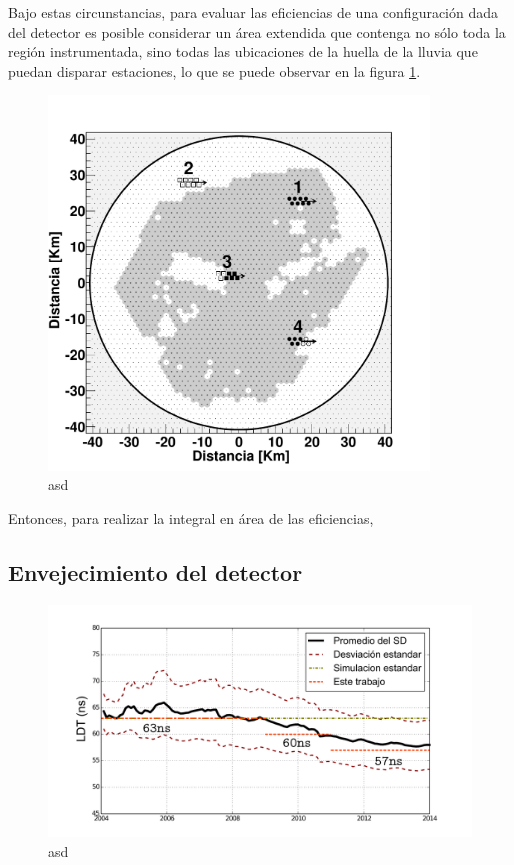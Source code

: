 	Bajo estas circunstancias, para evaluar las eficiencias de una configuración dada del detector es posible considerar un área extendida que contenga no sólo toda la región instrumentada, sino todas las ubicaciones de la huella de la lluvia que puedan disparar estaciones, lo que se puede observar en la figura \ref{fig:areaExtendida}.
	\begin{figure}[h!]
		\begin{center}
			\includegraphics[width=0.9\textwidth]{fig/resultadosAuger/aperturaReal}
			\caption{asd}
			\label{fig:areaExtendida}
		\end{center}
	\end{figure}
	
	Entonces, para realizar la integral en área de las eficiencias, 
	
	\subsection{Envejecimiento del detector}
	
	\begin{figure}[h!]
		\begin{center}
			\includegraphics[width=\textwidth]{fig/resultadosAuger/timeEvolution}
			\caption{asd}
			\label{fig:}
		\end{center}
	\end{figure}
	
